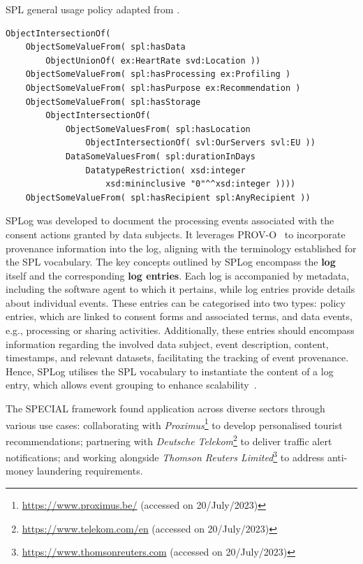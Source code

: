 \begin{listing}
\caption{SPL general usage policy adapted from \cite{bonatti_special_2019}.}
\label{list:spl_example}
\begin{verbatim}
ObjectIntersectionOf(
    ObjectSomeValueFrom( spl:hasData
        ObjectUnionOf( ex:HeartRate svd:Location ))
    ObjectSomeValueFrom( spl:hasProcessing ex:Profiling )
    ObjectSomeValueFrom( spl:hasPurpose ex:Recommendation )
    ObjectSomeValueFrom( spl:hasStorage
        ObjectIntersectionOf(
            ObjectSomeValuesFrom( spl:hasLocation
                ObjectIntersectionOf( svl:OurServers svl:EU ))
            DataSomeValuesFrom( spl:durationInDays
                DatatypeRestriction( xsd:integer
                    xsd:mininclusive "0"^^xsd:integer ))))
    ObjectSomeValueFrom( spl:hasRecipient spl:AnyRecipient ))
\end{verbatim}
\end{listing}

SPLog was developed to document the processing events associated with the consent actions granted by data subjects.
It leverages PROV-O~\citep{lebo_prov-o_2013} to incorporate provenance information into the log, aligning with the terminology established for the SPL vocabulary. 
The key concepts outlined by SPLog encompass the \textbf{log} itself and the corresponding \textbf{log entries}.
Each log is accompanied by metadata, including the software agent to which it pertains, while log entries provide details about individual events. 
These entries can be categorised into two types: policy entries, which are linked to consent forms and associated terms, and data events, e.g., processing or sharing activities. 
Additionally, these entries should encompass information regarding the involved data subject, event description, content, timestamps, and relevant datasets, facilitating the tracking of event provenance.
Hence, SPLog utilises the SPL vocabulary to instantiate the content of a log entry, which allows event grouping to enhance scalability~\citep{kirrane_transparency_2018}.

The SPECIAL framework found application across diverse sectors through various use cases: collaborating with \textit{Proximus}\footnote{\url{https://www.proximus.be/} (accessed on 20/July/2023)} to develop personalised tourist recommendations; partnering with \textit{Deutsche Telekom}\footnote{\url{https://www.telekom.com/en} (accessed on 20/July/2023)} to deliver traffic alert notifications; and working alongside \textit{Thomson Reuters Limited}\footnote{\url{https://www.thomsonreuters.com} (accessed on 20/July/2023)} to address anti-money laundering requirements.

